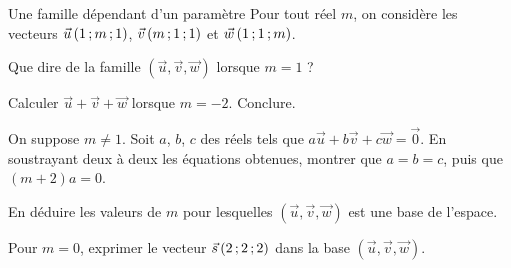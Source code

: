 \begin{exercice}[3]{Une famille dépendant d'un paramètre}
Pour tout réel $m$, on considère les vecteurs $\vec u\,(1\,{;}\, m\,{;}\,1)$, $\vec v\,(m\,{;}\,1\,{;}\,1)$ et $\vec w\,(1\,{;}\,1\,{;}\, m)$.
\begin{questions}
  \item Que dire de la famille $(\vec u,\vec v,\vec w)$ lorsque $m=1$ ?
  \item Calculer $\vec u+\vec v+\vec w$ lorsque $m=-2$. Conclure.
  \item On suppose $m\neq1$. Soit $a$, $b$, $c$ des réels tels que $a\vec u+b\vec v+c\vec w=\vec0$. En soustrayant deux à deux les
    équations obtenues, montrer que $a=b=c$, puis que $(m+2)a=0$.
  \item En déduire les valeurs de $m$ pour lesquelles $(\vec u,\vec v,\vec w)$ est une base de l'espace.
  \item Pour $m=0$, exprimer le vecteur $\vec s\,(2\,{;}\,2\,{;}\,2)$ dans la base $(\vec u,\vec v,\vec w)$.
\end{questions}
\end{exercice}

